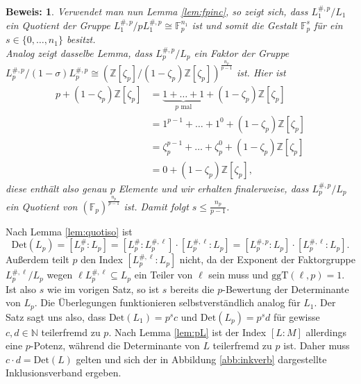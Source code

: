 \documentclass[12pt,a4paper,halfparskip,headsepline,bibtotocnumbered]{scrreprt}
\theoremstyle{nummermitklammern}
\theoremstyle{nonumberbreak}
\newtheorem{beweis}{Beweis:}
\newcommand{\N}{\mathbb{N}}
\newcommand{\Z}{\mathbb{Z}}
\newcommand{\F}{\mathbb{F}}
\newcommand{\Det}{\text{Det}}
\newcommand{\ggT}{\text{ggT}}
\begin{document}
\begin{beweis}
	Verwendet man nun Lemma \eqref{lem:fpinc}, so zeigt sich, dass $L_1^{\#, p} / L_1$ ein Quotient der Gruppe $L_1^{\#, p} / p L_1^{\#,p} \cong \F_p^{n_1}$ ist und somit die Gestalt $\F_p^s$ für ein $s \in \lbrace 0, \dots, n_1 \rbrace$ besitzt.\\
	Analog zeigt dasselbe Lemma, dass $L_p^{\#,p} / L_p$ ein Faktor der Gruppe $L_p^{\#,p} / (1 - \sigma) L_p^{\#,p} \cong (\Z\left[ \zeta_p \right] / (1 - \zeta_p) \Z\left[ \zeta_p \right])^\frac{n_p}{p-1}$ ist. Hier ist
	\begin{align*}
		p + (1 - \zeta_p) \Z\left[ \zeta_p \right] &= \underbrace{1 + \dots + 1}_{p \text{ mal}} + (1 - \zeta_p) \Z\left[ \zeta_p \right]\\
		&= 1^{p-1} + \dots + 1^0 + (1 - \zeta_p) \Z\left[ \zeta_p \right]\\
		 &= \zeta_p^{p-1} + \dots + \zeta_p^0 + (1 - \zeta_p) \Z\left[ \zeta_p \right]\\
		 &= 0 + (1 - \zeta_p) \Z\left[ \zeta_p \right],
	\end{align*}
	diese enthält also genau $p$ Elemente und wir erhalten finalerweise, dass $L_p^{\#, p} / L_p$ ein Quotient von $(\F_p)^\frac{n_p}{p-1}$ ist. Damit folgt $s \leq \frac{n_p}{p-1}$.
\end{beweis}

Nach Lemma \eqref{lem:quotiso} ist
\begin{equation*}
	\Det(L_p) = \left[ L_p^\# : L_p \right] = \left[ L_p^\# : L_p^{\#,\ell} \right] \cdot \left[ L_p^{\#, \ell} : L_p \right] = \left[ L_p^{\#,p} : L_p \right] \cdot \left[ L_p^{\#, \ell} : L_p \right].
\end{equation*}
Außerdem teilt $p$ den Index $\left[ L_p^{\#, \ell} : L_p \right]$ nicht, da der Exponent der Faktorgruppe $L_p^{\#, \ell} / L_p$ wegen $\ell L_p^{\#, \ell} \subseteq L_p$ ein Teiler von $\ell$ sein muss und $\ggT(\ell,p) = 1$. Ist also $s$ wie im vorigen Satz, so ist $s$ bereits die $p$-Bewertung der Determinante von $L_p$. Die Überlegungen funktionieren selbstverständlich analog für $L_1$. Der Satz sagt uns also, dass $\Det(L_1) = p^s c$ und $\Det(L_p) = p^s d$ für gewisse $c, d \in \N$ teilerfremd zu $p$. Nach Lemma \eqref{lem:pL} ist der Index $\left[ L : M \right]$ allerdings eine $p$-Potenz, während die Determinante von $L$ teilerfremd zu $p$ ist. Daher muss $c \cdot d = \Det(L)$ gelten und sich der in Abbildung \eqref{abb:inkverb} dargestellte Inklusionsverband ergeben.
\end{document}
